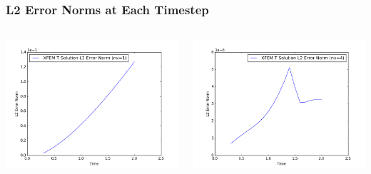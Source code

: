 \documentclass[]{beamer}
\begin{document}
\begin{frame}[t]\frametitle{L2 Error Norms at Each Timestep}
  	\begin{columns}
			\begin{center}
			\includegraphics[scale=0.3]{figures/1D_xy_h1m/1D_xy_homog1mat_nx1_L2_Errs}
			\end{center}
			\begin{center}
			\includegraphics[scale=0.3]{figures/1D_xy_h1m/1D_xy_homog1mat_nx4_L2_Errs}
			\end{center}
	\end{columns}
\end{frame}
\end{document}
